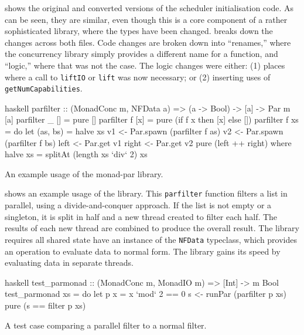  shows the original and converted versions of the
scheduler initialisation code.  As can be seen, they are similar, even
though this is a core component of a rather sophisticated library,
where the types have been changed.   breaks
down the changes across both files.  Code changes are broken down into
``renames,'' where the concurrency library simply provides a different
name for a function, and ``logic,'' where that was not the case.  The
logic changes were either: (1) places where a call to \verb|liftIO| or
\verb|lift| was now necessary; or (2) inserting uses of
\verb|getNumCapabilities|.

\begin{listing}
\centering
\begin{cminted}{haskell}
parfilter :: (MonadConc m, NFData a) => (a -> Bool) -> [a] -> Par m [a]
parfilter _ []  = pure []
parfilter f [x] = pure (if f x then [x] else [])
parfilter f xs  = do
    let (as, bs) = halve xs
    v1 <- Par.spawn (parfilter f as)
    v2 <- Par.spawn (parfilter f bs)
    left  <- Par.get v1
    right <- Par.get v2
    pure (left ++ right)
  where
    halve xs = splitAt (length xs `div` 2) xs
\end{cminted}
\caption{An example usage of the monad-par library.}\label{lst:parmonad_example1}
\end{listing}

 shows an example usage of the library.
This \verb|parfilter| function filters a list in parallel, using a
divide-and-conquer approach.  If the list is not empty or a singleton,
it is split in half and a new thread created to filter each half.  The
results of each new thread are combined to produce the overall result.
The library requires all shared state have an instance of the
\verb|NFData| typeclass, which provides an operation to evaluate data
to normal form.  The library gains its speed by evaluating data in
separate threads.

\begin{listing}
\centering
\begin{cminted}{haskell}
test_parmonad :: (MonadConc m, MonadIO m) => [Int] -> m Bool
test_parmonad xs = do
    let p x = x `mod` 2 == 0
    s <- runPar (parfilter p xs)
    pure (s == filter p xs)
\end{cminted}
\caption{A test case comparing a parallel filter to a normal filter.}\label{lst:parmonad_example2}
\end{listing}

